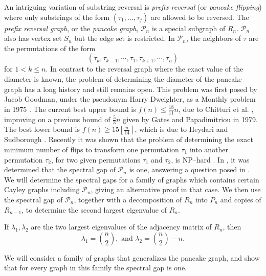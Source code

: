  An intriguing variation of substring reversal is  {\it prefix reversal} (or {\it pancake flipping}) where only
 substrings of the form $(\tau_1, \ldots, \tau_j)$ are allowed to be reversed.
The \textit{prefix reversal graph}, or  the \textit{pancake graph}, $\mathcal{P}_n$ 
is a special subgraph of $R_n$.  ${\mathcal P}_n$  also has vertex set $S_n$  but
the edge set is  restricted. In $\mathcal{P}_n$, the 
neighbors of $\tau$ are the permutations of the form  
 \[ (\tau_k, \tau_{k-1}, \cdots, \tau_1, \tau_{k+1}, \cdots, \tau_n) \]
for $1 < k \leq n$.
 In contrast to the reversal graph
where the exact value of the diameter is known, the problem of determining the diameter of the pancake  
graph has a long history and still remains open.
This problem was first posed by Jacob Goodman, under the pseudonym Harry Dweighter, as a Monthly problem
in 1975 \cite{Dweighter1975}.
The current best upper bound is $f(n) \leq \frac{18}{11} n $, due to
Chitturi et al. \cite{ChitturiEtAl2009}, improving on a previous bound of $\frac{5}{3} n$ given by
 Gates and Papadimitriou \cite{GatesPapadimitriou1979} in 1979.  The best lower bound is
$f(n) \geq 15 \left\lfloor \frac{n}{14} \right\rceil$, which is due to 
Heydari and Sudborough \cite{HeydariSudborough1997}.  Recently it was shown that the problem of  determining the exact minimum number of flips
to transform  one permutation $\tau_1$ into another permutation $\tau_2$, for two
given permutations $\tau_1$ and $\tau_2$, is NP--hard \cite{BulteauEtAl2015}.
  In \cite{Cesi2009}, it 
was determined that the spectral gap of $\mathcal{P}_n$ is one, answering a 
question posed in \cite{GunnellsEtAl2007}.
We will determine the spectral gaps for a family of graphs which contains certain Cayley graphs
including $\mathcal{P}_n$, giving an alternative proof in that case.
We then use the spectral gap of $\mathcal{P}_n$, together with a decomposition of $R_n$
into $P_n$ and copies of $R_{n-1}$, to determine the second largest
eigenvalue of $R_n$.


\begin{theorem}\label{thm:rev_eig}
 If $\lambda_1,\lambda_2$ are the two largest eigenvalues of the adjacency matrix
 of $R_n$, then  
 \[  \lambda_1 = \binom{n}{2}, \text{ and } \lambda_2 = \binom{n}{2}-n. \]
\end{theorem}



We will consider a family of graphs that generalizes the pancake graph, 
and show that for every graph in this family the spectral gap is one. 

